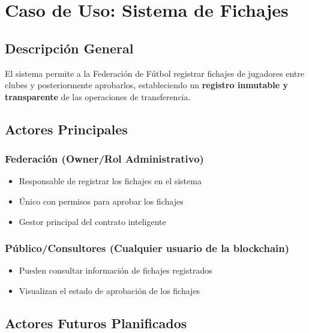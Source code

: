\documentclass[12pt,a4paper]{article}
\begin{document}
	\section{Caso de Uso: Sistema de Fichajes}
	
	\subsection{Descripción General}
	El sistema permite a la Federación de Fútbol registrar fichajes de jugadores entre clubes y posteriormente aprobarlos, estableciendo un \textbf{registro inmutable y transparente} de las operaciones de transferencia.
	
	\subsection{Actores Principales}
	
	\subsubsection{Federación (Owner/Rol Administrativo)}
	\begin{itemize}
		\item Responsable de registrar los fichajes en el sistema
		\item Único con permisos para aprobar los fichajes
		\item Gestor principal del contrato inteligente
	\end{itemize}
	
	\subsubsection{Público/Consultores (Cualquier usuario de la blockchain)}
	\begin{itemize}
		\item Pueden consultar información de fichajes registrados
		\item Visualizan el estado de aprobación de los fichajes
	\end{itemize}
	
	\subsection{Actores Futuros Planificados}
	
\end{document}
